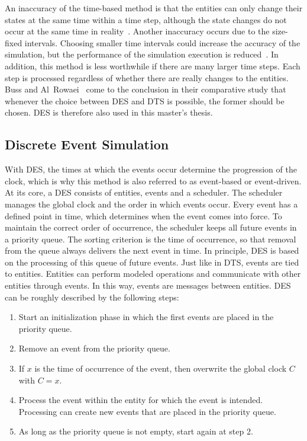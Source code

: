 \documentclass[english,version-2019-11]{uzl-thesis}
\begin{document}
An inaccuracy of the time-based method is
that the entities can only change their states
at the same time within a time step, although the state
changes do not occur at the same
time in reality~\cite{SimAccuracy}.
Another inaccuracy occurs due to the size-fixed intervals.
Choosing smaller time
intervals could increase the accuracy
of the simulation, but the performance
of the simulation execution is reduced~\cite{SimOverview}.
In addition, this method is less worthwhile if there
are many larger time steps. Each step
is processed regardless of whether there are really changes to the entities.
Buss and Al~Rowaei~\cite{SimAccuracy} come to the conclusion
in their comparative study that whenever
the choice between DES and DTS is possible,
the former should be chosen. DES is therefore also used in this master's thesis.

\subsection{Discrete Event Simulation}
With DES, the times at which the events occur determine the progression of the clock, which is why this method is also referred to as event-based or event-driven. At its core, a DES consists of entities, events and a scheduler. The scheduler manages the global clock and the order in which events occur. Every event has a defined point in time, which determines when the event comes into force. To maintain the correct order of occurrence, the scheduler keeps all future events in a priority queue.
The sorting criterion is the time of occurrence, so that removal from the queue always delivers the next event in time. In principle, DES is based on the processing of this queue of future events. Just like in DTS, events are tied to entities. Entities can perform modeled operations and communicate with other entities through events. In this way, events are messages between entities. DES can be roughly described by the following steps:
\begin{enumerate}
\item Start an initialization phase in which the first events are placed in the priority queue.
 \item Remove an event from the priority queue.
 \item If $x$ is the time of occurrence of the event, then overwrite the global clock $C$ with $C = x$.
 \item Process the event within the entity for which the event is intended. Processing can create new events that are placed in the priority queue.
 \item As long as the priority queue is not empty, start again at step 2.
\end{enumerate}
\end{document}
